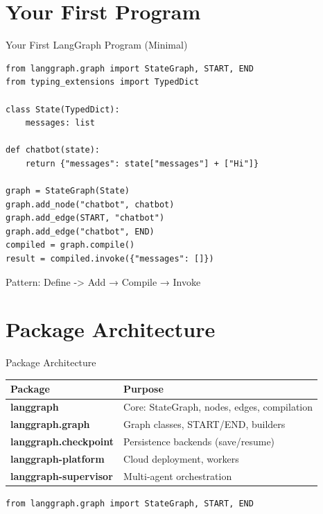 \documentclass[aspectratio=169,11pt]{beamer}
\begin{document}
\section{Your First Program}
\begin{frame}[fragile,t,shrink=3]{Your First LangGraph Program (Minimal)}
\vspace{0.02cm}

\begin{codebox}
\begin{lstlisting}
from langgraph.graph import StateGraph, START, END
from typing_extensions import TypedDict

class State(TypedDict):
    messages: list

def chatbot(state):
    return {"messages": state["messages"] + ["Hi"]}

graph = StateGraph(State)
graph.add_node("chatbot", chatbot)
graph.add_edge(START, "chatbot")
graph.add_edge("chatbot", END)
compiled = graph.compile()
result = compiled.invoke({"messages": []})
\end{lstlisting}
\end{codebox}

{\footnotesize Pattern: Define -> Add → Compile → Invoke}
\end{frame}

\section{Package Architecture}
\begin{frame}[t,shrink=5]{Package Architecture}
\setlength{\itemsep}{0.5pt}
\vspace{0.03cm}

\begin{tabular}{p{3.2cm}p{9cm}}
\toprule
\textbf{Package} & \textbf{Purpose} \\
\midrule
\textbf{langgraph} & Core: StateGraph, nodes, edges, compilation \\
\textbf{langgraph.graph} & Graph classes, START/END, builders \\
\textbf{langgraph.checkpoint} & Persistence backends (save/resume) \\
\textbf{langgraph-platform} & Cloud deployment, workers \\
\textbf{langgraph-supervisor} & Multi-agent orchestration \\
\bottomrule
\end{tabular}

\vspace{0.05cm}

\begin{tipbox}
{\footnotesize \texttt{from langgraph.graph import StateGraph, START, END}}
\end{tipbox}
\end{frame}
\end{document}
